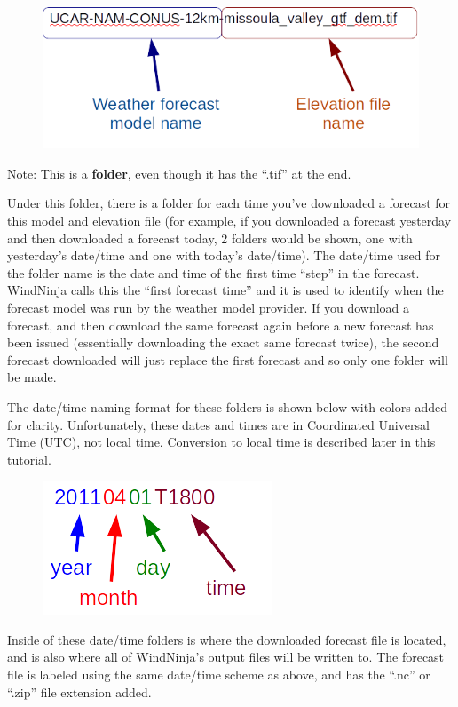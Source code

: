 \documentclass[12pt]{article}
\begin{document}
\begin{figure}[H]
	\centering
	\includegraphics[scale=1.0]{fil_diag}
\end{figure}

Note:  This is a \textbf{folder}, even though it has the “.tif” at the end.

Under this folder, there is a folder for each time you've downloaded a forecast for this model and elevation file (for example, if you downloaded a forecast yesterday and then downloaded a forecast today, 2 folders would be shown, one with yesterday's date/time and one with today's date/time).  The date/time used for the folder name is the date and time of the first time “step” in the forecast.  WindNinja calls this the “first forecast time” and it is used to identify when the forecast model was run by the weather model provider.  If you download a forecast, and then download the same forecast again before a new forecast has been issued (essentially downloading the exact same forecast twice), the second forecast downloaded will just replace the first forecast and so only one folder will be made.

The date/time naming format for these folders is shown below with colors added for clarity.  Unfortunately, these dates and times are in Coordinated Universal Time (UTC), not local time.  Conversion to local time is described later in this tutorial.

\begin{figure}[H]
	\centering
	\includegraphics[scale=1.0]{UTC_diag}
\end{figure}

Inside of these date/time folders is where the downloaded forecast file is located, and is also where all of WindNinja's output files will be written to.  The forecast file is labeled using the same date/time scheme as above, and has the “.nc” or “.zip” file extension added.
\end{document}
